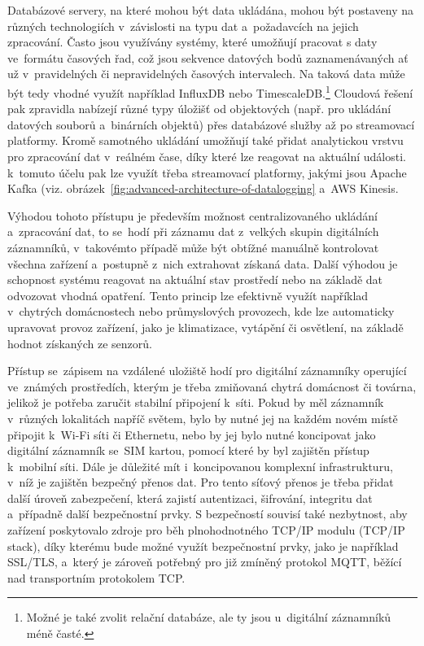 
Databázové servery, na které mohou být data ukládána, mohou být postaveny na různých technologiích v~závislosti na typu dat a~požadavcích na jejich zpracování. Často jsou využívány systémy, které umožňují pracovat s daty ve~formátu časových řad, což jsou sekvence datových bodů zaznamenávaných ať už v~pravidelných či nepravidelných časových intervalech. Na taková data může být tedy vhodné využít například InfluxDB nebo TimescaleDB.\footnote{Možné je také zvolit relační databáze, ale ty jsou u~digitální záznamníků méně časté.} Cloudová řešení pak zpravidla nabízejí různé typy úložišť od objektových (např. pro ukládání datových souborů a~binárních objektů) přes databázové služby až po streamovací platformy. Kromě samotného ukládání umožňují také přidat analytickou vrstvu pro zpracování dat v~reálném čase, díky které lze reagovat na aktuální události. k~tomuto účelu pak lze využít třeba streamovací platformy, jakými jsou Apache Kafka (viz. obrázek~\ref{fig:advanced-architecture-of-datalogging} a~AWS Kinesis.~\cite{springer_analysis_time_series_db_edge_computing}

Výhodou tohoto přístupu je především možnost centralizovaného ukládání a~zpracování dat, to se~hodí při záznamu dat z~velkých skupin digitálních záznamníků, v~takovémto případě může být obtížné manuálně kontrolovat všechna zařízení a~postupně z~nich extrahovat získaná data. Další výhodou je schopnost systému reagovat na aktuální stav prostředí nebo na základě dat odvozovat vhodná opatření. Tento princip lze efektivně využít například v~chytrých domácnostech nebo průmyslových provozech, kde lze automaticky upravovat provoz zařízení, jako je klimatizace, vytápění či osvětlení, na základě hodnot získaných ze senzorů.~\cite{springer_analysis_time_series_db_edge_computing, iot_datalogger_with_timestamping, researchgate_general_dataloggger_multiple_sdcards}

Přístup se~zápisem na vzdálené uložiště hodí pro digitální záznamníky operující ve~známých prostředích, kterým je třeba zmiňovaná chytrá domácnost či továrna, jelikož je potřeba zaručit stabilní připojení k~síti. Pokud by měl záznamník v~různých lokalitách napříč světem, bylo by nutné jej na každém novém místě připojit k~Wi-Fi síti či Ethernetu, nebo by jej bylo nutné koncipovat jako digitální záznamník se~SIM kartou, pomocí které by byl zajištěn přístup k~mobilní síti. Dále je důležité mít i~koncipovanou komplexní infrastrukturu, v~níž je zajištěn bezpečný přenos dat. Pro tento síťový přenos je třeba přidat další úroveň zabezpečení, která zajistí autentizaci, šifrování, integritu dat a~případně další bezpečnostní prvky. S bezpečností souvisí také nezbytnost, aby zařízení poskytovalo zdroje pro běh plnohodnotného TCP/IP modulu (TCP/IP stack), díky kterému bude možné využít bezpečnostní prvky, jako je například SSL/TLS, a~který je zároveň potřebný pro již zmíněný protokol MQTT, běžící nad transportním protokolem TCP.~\cite{springer_analysis_time_series_db_edge_computing, iot_datalogger_with_timestamping, researchgate_general_dataloggger_multiple_sdcards}



